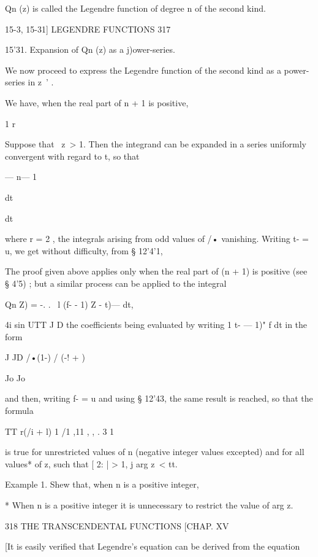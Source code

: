 {{Qn (z) is called the Legendre function of degree n of the second kind. 



15-3, 15-31] LEGENDRE FUNCTIONS 317 

15'31. Expansion of Qn (z) as a j)ower-series. 

We now proceed to express the Legendre function of the second kind as 
a power-series in z~' . 



We have, when the real part of n + 1 is positive, 

1 r 



Suppose that \ z\ > 1. Then the integrand can be expanded in a series 
uniformly convergent with regard to t, so that 



— n— 1 

dt 






dt 



where r = 2 , the integrals arising from odd values of /• vanishing. 
Writing t- = u, we get without difficulty, from § 12'4'1, 

The proof given above applies only when the real part of (n + 1) is positive 
(see § 4'5) ; but a similar process can be applied to the integral 

Qn  Z) = -. .  \ l  (f- - 1)   Z - t)—  dt, 

4i sin UTT J D  
the coefficients being evaluated by writing 1  t- — 1)" f dt in the form 

J JD 
/•(1-) / (-! + ) 

Jo Jo 

and then, writing f- = u and using § 12'43, the same result is reached, so 
that the formula 

TT  r(/i + l) 1 /1 ,11 , , . 3 1  

is true for unrestricted values of n (negative integer values excepted) and for 
all values* of z, such that [ 2: | > 1, j arg z\ < tt. 

Example 1. Shew that, when n is a positive integer, 

* When n is a positive integer it is unnecessary to restrict the value of arg z. 



318 THE TRANSCENDENTAL FUNCTIONS [CHAP. XV 

[It is easily verified that Legendre's equation can be derived from the equation 

}}
